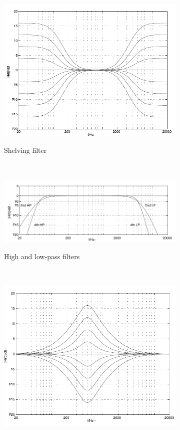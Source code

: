 \documentclass[a4paper,twoside,12pt]{book}
\begin{document}
\begin{figure}[H]
    \centering
    \begin{subfigure}[t]{0.25\textwidth}
        \includegraphics[width=\textwidth]{images/filter_shelving}
        \label{fig:shelf}
        \caption{Shelving filter}
    \end{subfigure}
    ~
    \begin{subfigure}[t]{0.45\textwidth}
        \includegraphics[width=\textwidth]{images/filter_pass}
        \label{fig:pass}
        \caption{High and low-pass filters}
    \end{subfigure}
    ~
    \begin{subfigure}[t]{0.25\textwidth}
        \includegraphics[width=\textwidth]{images/filter_peak}

\end{subfigure}
\end{figure}
\end{document}
